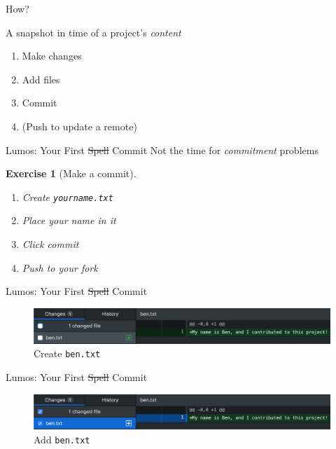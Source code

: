 \documentclass{beamer}
\theoremstyle{example}
\newtheorem{exercise}{Exercise}
\begin{document}
\begin{frame}{How?}
    \begin{definition}[Commit]
        A snapshot in time of a project's \emph{content}
    \end{definition}
    \begin{enumerate}[<+->]
        \item Make changes
        \item Add files
        \item Commit
        \item (Push to update a remote)
    \end{enumerate}
\end{frame}

\begin{frame}[fragile]{Lumos: Your First \sout{Spell} Commit}
    {Not the time for \emph{commitment} problems}
    \begin{exercise}[Make a commit]
        \begin{enumerate}
            \item Create \texttt{yourname.txt}
            \item Place your name in it
            \item Click commit
            \item Push to your fork
        \end{enumerate}
    \end{exercise}
\end{frame}

\begin{frame}{Lumos: Your First \sout{Spell} Commit}
    \begin{figure}
        \includegraphics[scale=0.4]{img/create_ben}
        \caption{Create \texttt{ben.txt}}
    \end{figure}
\end{frame}

\begin{frame}{Lumos: Your First \sout{Spell} Commit}
    \begin{figure}
        \includegraphics[scale=0.4]{img/add_ben}
        \caption{Add \texttt{ben.txt}}
    \end{figure}
\end{frame}
\end{document}
